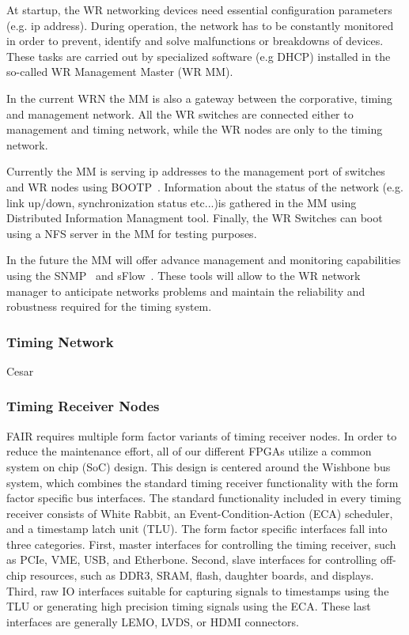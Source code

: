 At startup, the WR networking devices need essential configuration parameters (e.g. ip
address). During operation, the network has to be constantly monitored in
order to prevent, identify and solve malfunctions or breakdowns of devices. 
These tasks are carried out by specialized software (e.g DHCP) installed in the
so-called WR Management Master (WR MM). 

In the current WRN the MM is also a gateway between the corporative, timing and management 
network. All the WR switches are connected either to management and timing
network, while the WR nodes are only to the timing network. 

Currently the MM is serving ip addresses to the management port of switches and WR
nodes using BOOTP~\cite{bootp}. Information about the status of the network (e.g.
link up/down, synchronization status etc...)is gathered in the MM using Distributed Information Managment
tool. Finally, the WR Switches can boot using a NFS server in the MM for testing
purposes. 

In the future the MM will offer advance management and monitoring capabilities
using the SNMP~\cite{snmp} and sFlow~\cite{sflow}. These tools will allow to the 
WR network manager to anticipate networks problems and maintain the reliability
and robustness required for the timing system.


\subsubsection{Timing Network}

Cesar

\subsubsection{Timing Receiver Nodes}

FAIR requires multiple form factor variants of timing receiver nodes.
In order to reduce the maintenance effort,
all of our different FPGAs utilize a common system on chip (SoC) design.
This design is centered around the Wishbone bus system,
which combines the standard timing receiver functionality with 
the form factor specific bus interfaces.
The standard functionality included in every timing receiver
consists of White Rabbit, an Event-Condition-Action (ECA) scheduler,
and a timestamp latch unit (TLU).
The form factor specific interfaces fall into three categories.
First, master interfaces for controlling the timing receiver,
such as PCIe, VME, USB, and Etherbone.
Second, slave interfaces for controlling off-chip resources,
such as DDR3, SRAM, flash, daughter boards, and displays.
Third, raw IO interfaces suitable for capturing signals to 
timestamps using the TLU or generating high precision timing
signals using the ECA.
These last interfaces are generally LEMO, LVDS, or HDMI connectors.

